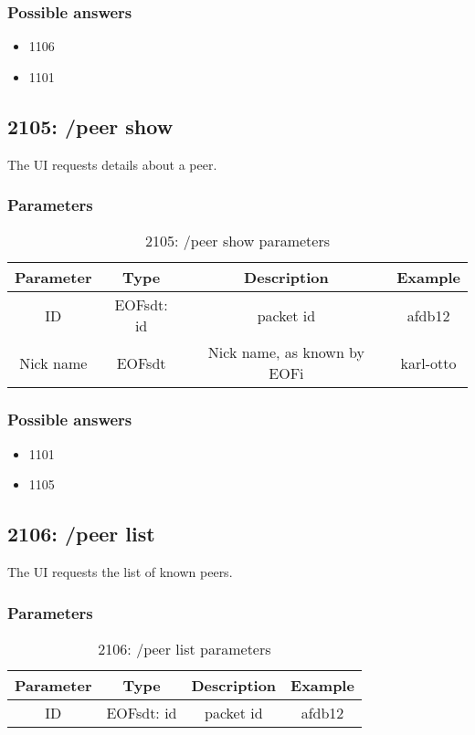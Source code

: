 \subsubsection{Possible answers}
\begin{itemize}
\item 1106
\item 1101
\end{itemize}

\subsection{2105: /peer show}
The UI requests details about a peer.

\subsubsection{Parameters}
\begin{longtable}{|c|c|c|c|}
\caption{2105: /peer show parameters}\\
\hline
\textbf{Parameter} & \textbf{Type} & \textbf{Description} & \textbf{Example}\\
\hline
ID & EOFsdt: id & packet id & afdb12\\
\hline
Nick name & EOFsdt & Nick name, as known by EOFi & karl-otto\\
\hline
\end{longtable}

\subsubsection{Possible answers}
\begin{itemize}
\item 1101
\item 1105
\end{itemize}
\subsection{2106: /peer list}
The UI requests the list of known peers.

\subsubsection{Parameters}
\begin{longtable}{|c|c|c|c|}
\caption{2106: /peer list parameters}\\
\hline
\textbf{Parameter} & \textbf{Type} & \textbf{Description} & \textbf{Example}\\
\hline
ID & EOFsdt: id & packet id & afdb12\\
\hline
\end{longtable}

